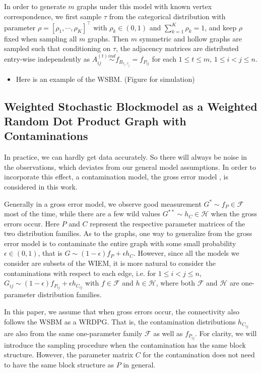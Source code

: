 \documentclass[a4paper]{article}
\begin{document}
In order to generate $m$ graphs under this model with known vertex correspondence, we first sample $\tau$ from the categorical distribution with parameter $\rho = [\rho_1, \cdots, \rho_K]^{\top}$ with $\rho_k \in (0, 1)$ and $\sum_{k = 1}^{K} \rho_k = 1$, and keep $\rho$ fixed when sampling all $m$ graphs. Then $m$ symmetric and hollow graphs are sampled such that conditioning on $\tau$, the adjacency matrices are distributed entry-wise independently as $A^{(t)}_{ij} \stackrel{ind}{\sim} f_{B_{\tau_i, \tau_j}} = f_{P_{ij}}$ for each $1 \le t \le m$, $1 \le i < j \le n$.


\begin{itemize}
\item Here is an example of the WSBM. (Figure for simulation)
\end{itemize}

\subsection{Weighted Stochastic Blockmodel as a Weighted Random Dot Product Graph with Contaminations}
\label{section:Contamination}

In practice, we can hardly get data accurately. So there will always be noise in the observations, which deviates from our general model assumptions. In order to incorporate this effect, a contamination model, the gross error model \citep{AIC:AIC690280519, bickel2001mathematical}, is considered in this work.

Generally in a gross error model, we observe good measurement $G^* \sim f_P \in \mathcal{F}$ most of the time, while there are a few wild values $G^{**} \sim h_C \in \mathcal{H}$ when the gross errors occur. Here $P$ and $C$ represent the respective parameter matrices of the two distribution families.
As to the graphs, one way to generalize from the gross error model is to contaminate the entire graph with some small probability $\epsilon \in (0, 1)$, that is $G \sim (1-\epsilon) f_P + \epsilon h_C$. However, since all the models we consider are subsets of the WIEM, it is more natural to consider the contaminations with respect to each edge, i.e. for $1 \le i <  j \le n$, $G_{ij} \sim (1-\epsilon) f_{P_{ij}} + \epsilon h_{C_{ij}}$ with $f \in \mathcal{F}$ and $h \in \mathcal{H}$, where both $\mathcal{F}$ and $\mathcal{H}$ are one-parameter distribution families.

In this paper, we assume that when gross errors occur, the connectivity also follows the WSBM as a WRDPG. That is, the contamination distributions $h_{C_{ij}}$ are also from the same one-parameter family $\mathcal{F}$ as well as $f_{P_{ij}}$. For clarity, we will introduce the sampling procedure when the contamination has the same block structure. However, the parameter matrix $C$ for the contamination does not need to have the same block structure as $P$ in general.
\end{document}

